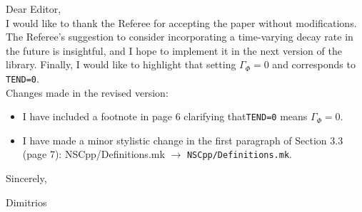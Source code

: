 \documentclass{article}
\begin{document}
Dear Editor,\\

\noindent
I would like to thank the Referee for accepting the paper without modifications. The Referee's suggestion to consider incorporating a time-varying decay rate in the future is insightful, and I hope to implement it in the next version of the library. Finally, I would like to highlight that setting $\Gamma_\Phi=0$ and corresponds to {\tt TEND=0}.\\

\noindent
Changes made in the revised version:

\begin{itemize}
\item I have included a footnote in page 6 clarifying that{\tt TEND=0} means $\Gamma_\Phi=0$.
\item I have made a minor stylistic change in the first paragraph of Section 3.3 (page 7): {NSCpp/Definitions.mk} $\to$ {\tt NSCpp/Definitions.mk}.
\end{itemize}

Sincerely,

Dimitrios
\end{document}
